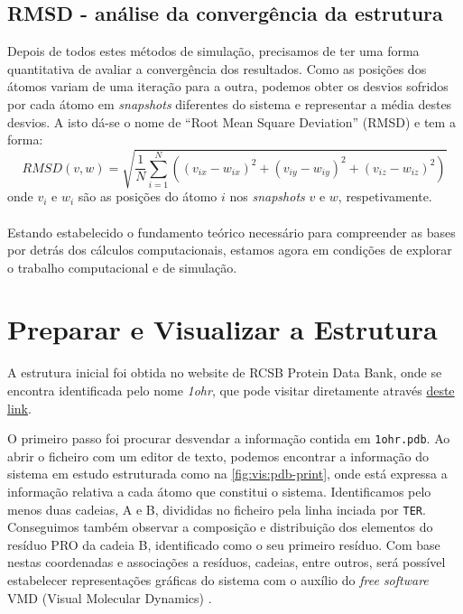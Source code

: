 \documentclass[12pt,a4paper]{article}
\begin{document}
\subsection{RMSD - análise da convergência da estrutura}
	Depois de todos estes métodos de simulação, precisamos de ter uma forma quantitativa de avaliar a convergência dos resultados. Como as posições dos átomos variam de uma iteração para a outra, podemos obter os desvios sofridos por cada átomo em \textit{snapshots} diferentes do sistema e representar a média destes desvios. A isto dá-se o nome de ``Root Mean Square Deviation'' (RMSD) e tem a forma:
	\begin{equation}
		R M S D(v, w)=\sqrt{\frac{1}{N} \sum_{i=1}^{N}\left(\left(v_{i x}-w_{i x}\right)^{2}+\left(v_{i y}-w_{i y}\right)^{2}+\left(v_{i z}-w_{i z}\right)^{2}\right)}
	\end{equation}
	onde $v_i$ e $w_i$ são as posições do átomo $i$ nos \textit{snapshots} $v$ e $w$, respetivamente.
	
	\paragraph{}Estando estabelecido o fundamento teórico necessário para compreender as bases por detrás dos cálculos computacionais, estamos agora em condições de explorar o trabalho computacional e de simulação.
\section{Preparar e Visualizar a Estrutura}
	A estrutura inicial foi obtida no website de RCSB Protein Data Bank, onde se encontra identificada pelo nome \textit{1ohr}, que pode visitar diretamente através \href{https://www.rcsb.org/structure/1OHR}{deste link}.
	
	O primeiro passo foi procurar desvendar a informação contida em \verb|1ohr.pdb|. Ao abrir o ficheiro com um editor de texto, podemos encontrar a informação do sistema em estudo estruturada como na \cref{fig:vis:pdb-print}, onde está expressa a informação relativa a cada átomo que constitui o sistema. Identificamos pelo menos duas cadeias, A e B, divididas no ficheiro pela linha inciada por \verb|TER|. Conseguimos também observar a composição e distribuição dos elementos do resíduo PRO da cadeia B, identificado como o seu primeiro resíduo. Com base nestas coordenadas e associações a resíduos, cadeias, entre outros, será possível estabelecer representações gráficas do sistema com o auxílio do \textit{free software} VMD (Visual Molecular Dynamics) \cite{HUMP96}.
	
\end{document}
